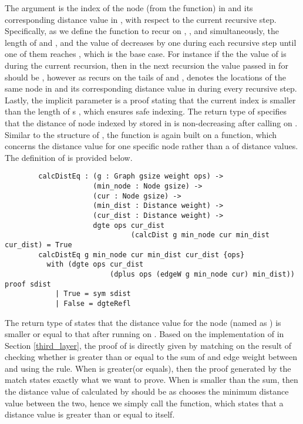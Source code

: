 The  argument is the index of the node (from the  function) in  and its corresponding distance value in , with respect to the current recursive step. Specifically, as we define the  function to recur on , , and  simultaneously, the length of  and , and the value of  decreases by one during each recursive step until one of them reaches , which is the base case. For instance if the the value of  is  during the current recursion, then in the next recursion the value passed in for  should be , however as  recurs on the tails of  and ,  denotes the locations of the same node in  and its corresponding distance value in  during every recursive step. Lastly, the implicit parameter  is a proof stating that the current index  is smaller than the length of s , which ensures safe indexing. The return type of  specifies that the distance of node indexed by  stored in  is non-decreasing after calling  on . 
\\

Similar to the structure of , the  function is again built on a  function, which concerns the distance value for one specific node rather than a  of distance values. The definition of  is provided below. 
\begin{lstlisting}
		calcDistEq : (g : Graph gsize weight ops) ->
		             (min_node : Node gsize) ->
		             (cur : Node gsize) ->
		             (min_dist : Distance weight) ->
		             (cur_dist : Distance weight) ->
		             dgte ops cur_dist 
		             		  (calcDist g min_node cur min_dist cur_dist) = True
		calcDistEq g min_node cur min_dist cur_dist {ops}
		  with (dgte ops cur_dist 
		  				 (dplus ops (edgeW g min_node cur) min_dist)) proof sdist
		    | True = sym sdist
		    | False = dgteRefl
\end{lstlisting}

The return type of  states that the distance value for the node  (named as ) is smaller or equal to that after running  on . Based on the implementation of  in Section \ref{third_layer}, the proof of  is directly given by matching on the result of checking whether  is greater than or equal to the sum of  and edge weight between  and  using the  rule. When  is greater(or equals), then the proof  generated by the match states exactly what we want to prove. When  is smaller than the sum, then the distance value of  calculated by  should be  as  chooses the minimum distance value between the two, hence we simply call the  function, which states that a distance value is greater than or equal to itself. 
\\

